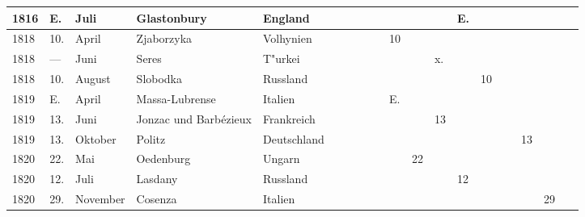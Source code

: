 \documentclass[a4paper, 8pt, oneside, polutonikogreek, german]{article}
\begin{document}
\begin{landscape}
\begin{table}[H]
\begin{longtable}{|p{5mm}|p{4mm}|p{13mm}|p{17mm}|p{17mm}|p{4mm}|p{6mm}|p{6mm}|p{6mm}|p{4mm}|p{5mm}|p{4mm}|p{5mm}|p{6mm}|p{5mm}|p{5mm}|p{5mm}|}
        1816 & E. & Juli & Glastonbury & England & ~ & ~ & ~ & ~ & ~ & ~ & E. & ~ & ~ & ~ & ~ & ~ \\ \hline
        1818 & 10. & April & Zjaborzyka & Volhynien & ~ & ~ & ~ & 10 & ~ & ~ & ~ & ~ & ~ & ~ & ~ & ~ \\ \hline
        1818 & --- & Juni & Seres & T"urkei & ~ & ~ & ~ & ~ & ~ & x. & ~ & ~ & ~ & ~ & ~ & ~ \\ \hline
        1818 & 10. & August & Slobodka & Russland & ~ & ~ & ~ & ~ & ~ & ~ & ~ & 10 & ~ & ~ & ~ & ~ \\ \hline
        1819 & E. & April & Massa-Lubrense & Italien & ~ & ~ & ~ & E. & ~ & ~ & ~ & ~ & ~ & ~ & ~ & ~ \\ \hline
        1819 & 13. & Juni & Jonzac und Barbézieux & Frankreich & ~ & ~ & ~ & ~ & ~ & 13 & ~ & ~ & ~ & ~ & ~ & ~ \\ \hline
        1819 & 13. & Oktober & Politz & Deutschland & ~ & ~ & ~ & ~ & ~ & ~ & ~ & ~ & ~ & 13 & ~ & ~ \\ \hline
        1820 & 22. & Mai & Oedenburg & Ungarn & ~ & ~ & ~ & ~ & 22 & ~ & ~ & ~ & ~ & ~ & ~ & ~ \\ \hline
        1820 & 12. & Juli & Lasdany & Russland & ~ & ~ & ~ & ~ & ~ & ~ & 12 & ~ & ~ & ~ & ~ & ~ \\ \hline
        1820 & 29. & November & Cosenza & Italien & ~ & ~ & ~ & ~ & ~ & ~ & ~ & ~ & ~ & ~ & 29 & ~ \\ \hline
    \end{longtable}
\end{table}
\end{landscape}
\clearpage
\end{document}
